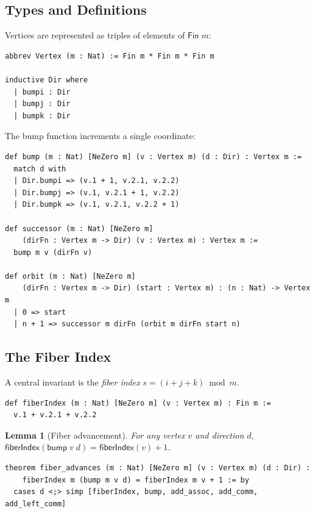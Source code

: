 \documentclass[11pt,a4paper]{article}
\newtheorem{lemma}[theorem]{Lemma}
\begin{document}
\subsection{Types and Definitions}

Vertices are represented as triples of elements of $\mathsf{Fin}\;m$:

\begin{lstlisting}[caption={Basic types}]
abbrev Vertex (m : Nat) := Fin m * Fin m * Fin m

inductive Dir where
  | bumpi : Dir
  | bumpj : Dir
  | bumpk : Dir
\end{lstlisting}

The bump function increments a single coordinate:

\begin{lstlisting}[caption={Bump and orbit}]
def bump (m : Nat) [NeZero m] (v : Vertex m) (d : Dir) : Vertex m :=
  match d with
  | Dir.bumpi => (v.1 + 1, v.2.1, v.2.2)
  | Dir.bumpj => (v.1, v.2.1 + 1, v.2.2)
  | Dir.bumpk => (v.1, v.2.1, v.2.2 + 1)

def successor (m : Nat) [NeZero m]
    (dirFn : Vertex m -> Dir) (v : Vertex m) : Vertex m :=
  bump m v (dirFn v)

def orbit (m : Nat) [NeZero m]
    (dirFn : Vertex m -> Dir) (start : Vertex m) : (n : Nat) -> Vertex m
  | 0 => start
  | n + 1 => successor m dirFn (orbit m dirFn start n)
\end{lstlisting}

\subsection{The Fiber Index}

A central invariant is the \emph{fiber index} $s = (i + j + k) \bmod m$.

\begin{lstlisting}[caption={Fiber index}]
def fiberIndex (m : Nat) [NeZero m] (v : Vertex m) : Fin m :=
  v.1 + v.2.1 + v.2.2
\end{lstlisting}

\begin{lemma}[Fiber advancement]
For any vertex $v$ and direction $d$,
$\mathsf{fiberIndex}(\mathsf{bump}\;v\;d) = \mathsf{fiberIndex}(v) + 1$.
\end{lemma}

\begin{lstlisting}[caption={Fiber advances}]
theorem fiber_advances (m : Nat) [NeZero m] (v : Vertex m) (d : Dir) :
    fiberIndex m (bump m v d) = fiberIndex m v + 1 := by
  cases d <;> simp [fiberIndex, bump, add_assoc, add_comm, add_left_comm]
\end{lstlisting}
\end{document}
